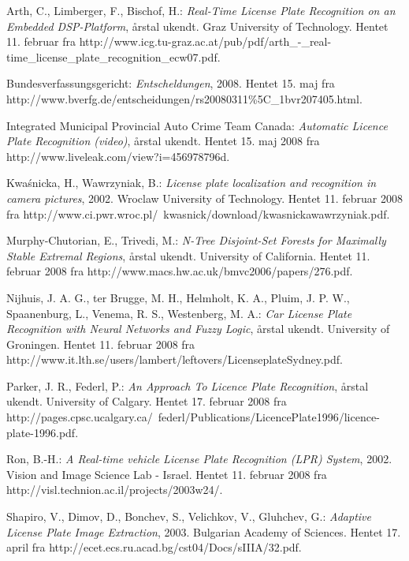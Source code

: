 \documentclass[11pt,a4paper,final]{article}
\begin{document}
\begin{thebibliography}{99}
%



 Arth, C., Limberger, F., Bischof, H.: \textit{Real-Time License Plate Recognition on an Embedded DSP-Platform}, årstal ukendt. Graz University of Technology. Hentet 11. februar fra http://www.icg.tu-graz.ac.at/pub/pdf/arth\_-\_real-time\_license\_plate\_recognition\_ecw07.pdf.

 Bundesverfassungsgericht: \textit{Entscheldungen}, 2008. Hentet 15. maj fra http://www.bverfg.de/entscheidungen/rs20080311\%5C\_1bvr207405.html.

 Integrated Municipal Provincial Auto Crime Team Canada: \textit{Automatic Licence Plate Recognition (video)}, årstal ukendt. Hentet 15. maj 2008 fra http://www.liveleak.com/view?i=456978796d.

 Kwa\'snicka, H., Wawrzyniak, B.: \textit{License plate localization and recognition in camera pictures}, 2002. Wroclaw University of Technology. Hentet 11. februar 2008 fra http://www.ci.pwr.wroc.pl/~kwasnick/download/kwasnickawawrzyniak.pdf.

 Murphy-Chutorian, E., Trivedi, M.: \textit{N-Tree Disjoint-Set Forests for Maximally Stable Extremal Regions}, årstal ukendt. University of California. Hentet 11. februar 2008 fra http://www.macs.hw.ac.uk/bmvc2006/papers/276.pdf.

 Nijhuis, J. A. G., ter Brugge, M. H., Helmholt, K. A., Pluim, J. P. W., Spaanenburg, L., Venema, R. S., Westenberg, M. A.: \textit{Car License Plate Recognition with Neural Networks and Fuzzy Logic}, årstal ukendt. University of Groningen. Hentet 11. februar 2008 fra http://www.it.lth.se/users/lambert/leftovers/LicenseplateSydney.pdf.

 Parker, J. R., Federl, P.: \textit{An Approach To Licence Plate Recognition}, årstal ukendt. University of Calgary. Hentet 17. februar 2008 fra http://pages.cpsc.ucalgary.ca/~federl/Publications/LicencePlate1996/licence-plate-1996.pdf.

 Ron, B.-H.: \textit{A Real-time vehicle License Plate Recognition (LPR) System}, 2002. Vision and Image Science Lab - Israel. Hentet 11. februar 2008 fra http://visl.technion.ac.il/projects/2003w24/.

 Shapiro, V., Dimov, D., Bonchev, S., Velichkov, V., Gluhchev, G.: \textit{Adaptive License Plate Image Extraction}, 2003. Bulgarian Academy of Sciences. Hentet 17. april fra http://ecet.ecs.ru.acad.bg/cst04/Docs/sIIIA/32.pdf.


\end{thebibliography}
\end{document}
